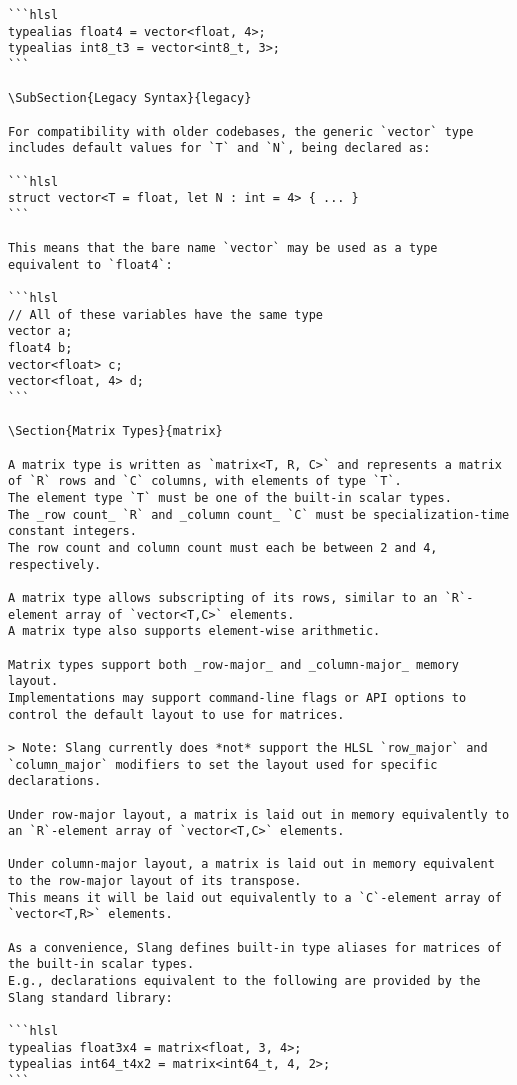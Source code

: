\begin{verbatim}
```hlsl
typealias float4 = vector<float, 4>;
typealias int8_t3 = vector<int8_t, 3>;
```

\SubSection{Legacy Syntax}{legacy}

For compatibility with older codebases, the generic `vector` type includes default values for `T` and `N`, being declared as:

```hlsl
struct vector<T = float, let N : int = 4> { ... }
```

This means that the bare name `vector` may be used as a type equivalent to `float4`:

```hlsl
// All of these variables have the same type
vector a;
float4 b;
vector<float> c;
vector<float, 4> d;
```

\Section{Matrix Types}{matrix}

A matrix type is written as `matrix<T, R, C>` and represents a matrix of `R` rows and `C` columns, with elements of type `T`.
The element type `T` must be one of the built-in scalar types.
The _row count_ `R` and _column count_ `C` must be specialization-time constant integers.
The row count and column count must each be between 2 and 4, respectively.

A matrix type allows subscripting of its rows, similar to an `R`-element array of `vector<T,C>` elements.
A matrix type also supports element-wise arithmetic.

Matrix types support both _row-major_ and _column-major_ memory layout.
Implementations may support command-line flags or API options to control the default layout to use for matrices.

> Note: Slang currently does *not* support the HLSL `row_major` and `column_major` modifiers to set the layout used for specific declarations.

Under row-major layout, a matrix is laid out in memory equivalently to an `R`-element array of `vector<T,C>` elements.

Under column-major layout, a matrix is laid out in memory equivalent to the row-major layout of its transpose.
This means it will be laid out equivalently to a `C`-element array of `vector<T,R>` elements.

As a convenience, Slang defines built-in type aliases for matrices of the built-in scalar types.
E.g., declarations equivalent to the following are provided by the Slang standard library:

```hlsl
typealias float3x4 = matrix<float, 3, 4>;
typealias int64_t4x2 = matrix<int64_t, 4, 2>;
```


\end{verbatim}
